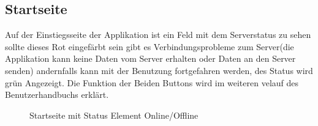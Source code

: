 \subsection{Startseite}
Auf der Einstiegsseite der Applikation ist ein Feld mit dem Serverstatus zu sehen sollte dieses Rot eingefärbt sein gibt es Verbindungsprobleme zum Server(die Applikation kann keine Daten vom Server erhalten oder Daten an den Server senden) andernfalls kann mit der Benutzung fortgefahren werden, des Status wird grün Angezeigt. Die Funktion der Beiden Buttons wird im weiteren velauf des Benutzerhandbuchs erklärt.
\\
\begin{figure}[H]
    \centering
    \qquad
    \caption{Startseite mit Status Element Online/Offline}
    \label{img:flags}
\end{figure}
\\
